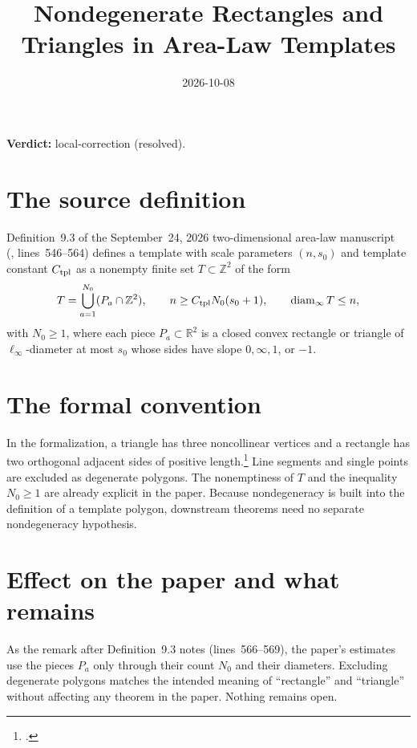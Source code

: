 \documentclass{article}
\title{Nondegenerate Rectangles and Triangles in Area-Law Templates}
\author{}
\date{2026-10-08}
\providecommand{\leanid}[1]{\textsf{\detokenize{#1}}}
\providecommand{\gapnote}[2]{\par\noindent\textbf{Verdict:} #1 (#2).\par}
\begin{document}
\maketitle
\gapnote{local-correction}{resolved}

\section{The source definition}

Definition~9.3 of the September~24, 2026 two-dimensional area-law
manuscript~\cite{OpenAI2026AreaLaw} (, lines~546--564)
defines a template with scale parameters $(n,s_0)$ and template constant
$C_{\rm tpl}$ as a nonempty finite set $T\subset\mathbb Z^2$ of the form
\[
  T=\bigcup_{a=1}^{N_0}(P_a\cap\mathbb Z^2),
  \qquad n\ge C_{\rm tpl}N_0(s_0+1),
  \qquad \operatorname{diam}_\infty T\le n,
\]
with $N_0\ge1$, where each piece $P_a\subset\mathbb R^2$ is a closed convex
rectangle or triangle of $\ell_\infty$-diameter at most $s_0$ whose sides have
slope $0,\infty,1$, or $-1$.

\section{The formal convention}

In the formalization, a triangle has three noncollinear vertices and a
rectangle has two orthogonal adjacent sides of positive
length.\footnote{\leanid{ManyBody.TemplatePolygon}.}
Line segments and single points are excluded as degenerate polygons. The
nonemptiness of $T$ and the inequality $N_0\ge1$ are already explicit in the
paper. Because nondegeneracy is built into the definition of a template
polygon, downstream theorems need no separate nondegeneracy hypothesis.

\section{Effect on the paper and what remains}

As the remark after Definition~9.3 notes (lines~566--569), the paper's
estimates use the pieces $P_a$ only through their count $N_0$ and their
diameters. Excluding degenerate polygons matches the intended meaning of
``rectangle'' and ``triangle'' without affecting any theorem in the paper.
Nothing remains open.



\end{document}
